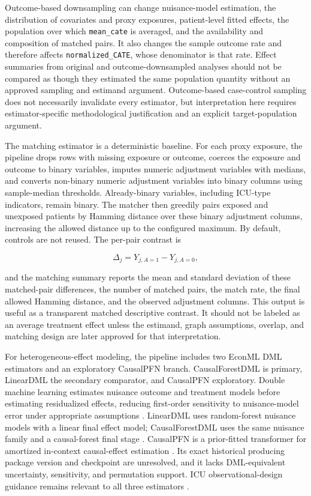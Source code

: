 Outcome-based downsampling can change nuisance-model estimation, the distribution of covariates and proxy exposures, patient-level fitted effects, the population over which \texttt{mean\_cate} is averaged, and the availability and composition of matched pairs.  It also changes the sample outcome rate and therefore affects \texttt{normalized\_CATE}, whose denominator is that rate.  Effect summaries from original and outcome-downsampled analyses should not be compared as though they estimated the same population quantity without an approved sampling and estimand argument.  Outcome-based case-control sampling does not necessarily invalidate every estimator, but interpretation here requires estimator-specific methodological justification and an explicit target-population argument.

The matching estimator is a deterministic baseline.  For each proxy exposure, the pipeline drops rows with missing exposure or outcome, coerces the exposure and outcome to binary variables, imputes numeric adjustment variables with medians, and converts non-binary numeric adjustment variables into binary columns using sample-median thresholds.  Already-binary variables, including ICU-type indicators, remain binary.  The matcher then greedily pairs exposed and unexposed patients by Hamming distance over these binary adjustment columns, increasing the allowed distance up to the configured maximum.  By default, controls are not reused.  The per-pair contrast is

\[
\Delta_j = Y_{j,A=1} - Y_{j,A=0},
\]

and the matching summary reports the mean and standard deviation of these matched-pair differences, the number of matched pairs, the match rate, the final allowed Hamming distance, and the observed adjustment columns.  This output is useful as a transparent matched descriptive contrast.  It should not be labeled as an average treatment effect unless the estimand, graph assumptions, overlap, and matching design are later approved for that interpretation.

For heterogeneous-effect modeling, the pipeline includes two EconML DML estimators and an exploratory CausalPFN branch.  CausalForestDML is primary, LinearDML the secondary comparator, and CausalPFN exploratory.  Double machine learning estimates nuisance outcome and treatment models before estimating residualized effects, reducing first-order sensitivity to nuisance-model error under appropriate assumptions \cite{chernozhukov2018dml,oprescu_et_al_2019_econml}.  LinearDML uses random-forest nuisance models with a linear final effect model; CausalForestDML uses the same nuisance family and a causal-forest final stage \cite{wager2018causalforest}.  CausalPFN is a prior-fitted transformer for amortized in-context causal-effect estimation \cite{balazadeh2025causalpfn}.  Its exact historical producing package version and checkpoint are unresolved, and it lacks DML-equivalent uncertainty, sensitivity, and permutation support.  ICU observational-design guidance remains relevant to all three estimators \cite{smit_2023_causal_inference_icu_scoping_review}.

